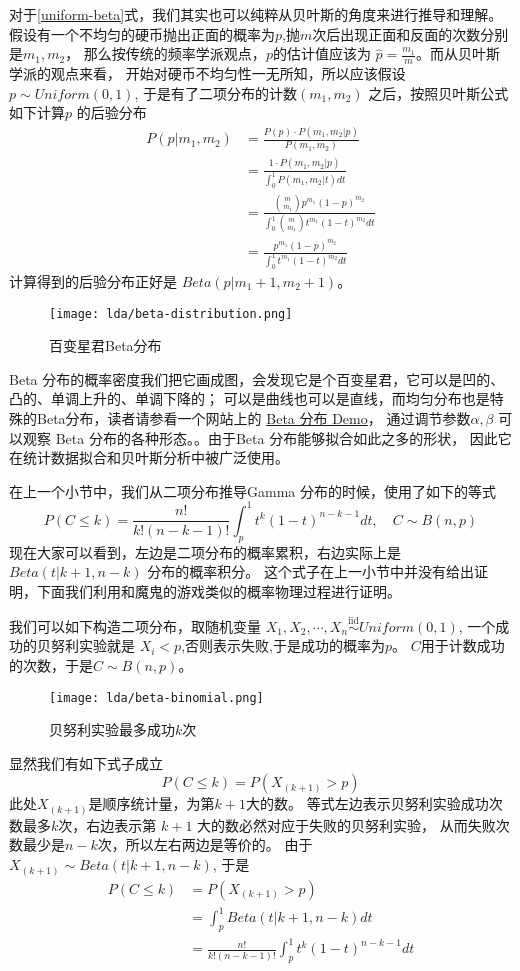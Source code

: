 对于\eqref{uniform-beta}式，我们其实也可以纯粹从贝叶斯的角度来进行推导和理解。
假设有一个不均匀的硬币抛出正面的概率为$p$,抛$m$次后出现正面和反面的次数分别是$m_1,m_2$，
那么按传统的频率学派观点，$p$的估计值应该为 $\hat{p}=\frac{m_1}{m}$。而从贝叶斯学派的观点来看，
开始对硬币不均匀性一无所知，所以应该假设$p\sim Uniform(0,1)$, 于是有了二项分布的计数$(m_1,m_2)$
之后，按照贝叶斯公式如下计算$p$ 的后验分布
\begin{align*}
P(p|m_1,m_2)  & = \frac{P(p)\cdot P(m_1,m_2|p)}{P(m_1,m_2)} \\
& = \frac{1\cdot P(m_1,m_2|p)}{\int_0^1 P(m_1,m_2|t)dt} \\
& = \frac{\binom{m}{m_1}p^{m_1}(1-p)^{m_2}}{\int_0^1 \binom{m}{m_1}t^{m_1}(1-t)^{m_2}dt} \\
& = \frac{p^{m_1}(1-p)^{m_2}}{\int_0^1 t^{m_1}(1-t)^{m_2}dt}
\end{align*}
计算得到的后验分布正好是 $Beta(p|m_1+1,m_2+1)$。

\begin{figure}[htbp]
\centering
\texttt{[image: lda/beta-distribution.png]}
\caption{百变星君Beta分布}
\end{figure}
Beta 分布的概率密度我们把它画成图，会发现它是个百变星君，它可以是凹的、凸的、单调上升的、单调下降的；
可以是曲线也可以是直线，而均匀分布也是特殊的Beta分布，读者请参看一个网站上的
\href{http://www.aiaccess.net/English/Glossaries/GlosMod/e_gm_beta_distri.htm}{Beta 分布 Demo}，
通过调节参数$\alpha,\beta$ 可以观察 Beta 分布的各种形态。。由于Beta 分布能够拟合如此之多的形状，
因此它在统计数据拟合和贝叶斯分析中被广泛使用。

在上一个小节中，我们从二项分布推导Gamma 分布的时候，使用了如下的等式
\begin{equation}
\label{binomial-beta2}
P(C \le k) = \frac{n!}{k!(n-k-1)!} \int_p^1 t^k(1-t)^{n-k-1} dt,  \quad  C\sim B(n,p)
\end{equation}
现在大家可以看到，左边是二项分布的概率累积，右边实际上是$Beta(t|k+1,n-k)$ 分布的概率积分。
这个式子在上一小节中并没有给出证明，下面我们利用和魔鬼的游戏类似的概率物理过程进行证明。

我们可以如下构造二项分布，取随机变量 $X_1, X_2, \cdots, X_n {\stackrel{\mathrm{iid}}{\sim}}Uniform(0,1)$,
一个成功的贝努利实验就是 $X_i<p$,否则表示失败,于是成功的概率为$p$。
$C$用于计数成功的次数，于是$C\sim B(n,p)$。
\begin{figure}[H]
\centering
\texttt{[image: lda/beta-binomial.png]}
\caption{贝努利实验最多成功$k$次}
\end{figure}
显然我们有如下式子成立
$$ P(C \le k) = P(X_{(k+1)} > p)$$
此处$X_{(k+1)}$是顺序统计量，为第$k+1$大的数。
等式左边表示贝努利实验成功次数最多$k$次，右边表示第 $k+1$ 大的数必然对应于失败的贝努利实验，
从而失败次数最少是$n-k$次，所以左右两边是等价的。
由于$X_{(k+1)} \sim Beta(t|k+1, n-k)$, 于是
\begin{align*}
P(C \le k) & = P(X_{(k+1)} > p) \\
&= \int_p^1 Beta(t|k+1, n-k)dt \\
&= \frac{n!}{k!(n-k-1)!} \int_p^1 t^k(1-t)^{n-k-1} dt
\end{align*}

